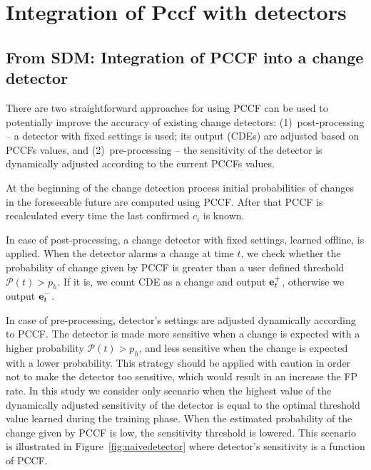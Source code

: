 \chapter{Integration of Pccf with detectors}

\section{From SDM: Integration of PCCF into a change detector}
\label{sec:pccf_integration}
There are two straightforward approaches for using PCCF can be used to potentially improve the accuracy of existing change detectors:
(1)~post-processing -- a detector with fixed settings is used; its output (CDEs) are adjusted based on PCCFs values,
and (2)~pre-processing -- the sensitivity of the detector is dynamically adjusted according to the current PCCFs values.

At the beginning of the change detection process initial probabilities of changes in the foreseeable future are computed using PCCF.
After that PCCF is recalculated every time the last confirmed $c_i$ is known.

In case of post-processing, a change detector with fixed settings, learned offline, is applied.
When the detector alarms a change at time $t$, we check whether the probability of change given by PCCF is greater than a user defined threshold $\mathcal{P}(t) > p_h$.
If it is, we count CDE as a change and output $\mathbf{e}_{t}^{+}$, otherwise we output $\mathbf{e}_{t}^{-}$.

In case of pre-processing, detector's settings are adjusted dynamically according to PCCF. The detector is made more sensitive when a change is expected with a higher probability $\mathcal{P}(t) > p_h$, and less sensitive when the change is expected with a lower probability.
This strategy should be applied with caution in order not to make the detector too sensitive, which would result in an increase the FP rate.
In this study we consider only scenario when the highest value of the dynamically adjusted sensitivity of the detector is equal to the optimal threshold value learned during the training phase.
When the estimated probability of the change given by PCCF is low, the sensitivity threshold is lowered.
This scenario is illustrated in Figure~\ref{fig:naivedetector} where detector's sensitivity is a function of PCCF.

